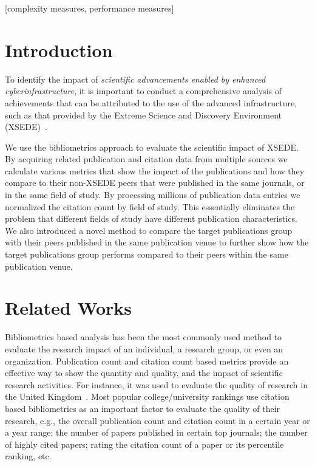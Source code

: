 \documentclass{sig-alternate}
\begin{document}
\vspace{-6pt}

[complexity measures,
performance measures]



\section{Introduction} 

To identify the impact of {\em scientific advancements enabled by
  enhanced cyberinfrastructure}, it is important to conduct a
comprehensive analysis of achievements that can be attributed to the
use of the advanced infrastructure, such as that provided by the
Extreme Science and Discovery Environment
(XSEDE)~\cite{www-xsede,xsede}.

We use the bibliometrics approach to evaluate the scientific impact of
XSEDE. By acquiring related publication and citation data from
multiple sources we calculate various metrics that show the impact of
the publications and how they compare to their non-XSEDE peers that
were published in the same journals, or in the same field of study. By
processing millions of publication data entries we normalized the
citation count by field of study. This essentially eliminates the
problem that different fields of study have different publication
characteristics. We also introduced a novel method to compare the
target publications group with their peers published in the same
publication venue to further show how the target publications group
performs compared to their peers within the same publication venue.


\section{Related Works} \label{S:related}

Bibliometrics based analysis has been the most commonly used method to
evaluate the research impact of an individual, a research group, or
even an organization. Publication count and citation count based
metrics provide an effective way to show the quantity and quality, and
the impact of scientific research activities. For instance, it was
used to evaluate the quality of research in the United
Kingdom~\cite{thomas1998institutional,penfield2014assessment}. Most
popular college/university rankings use citation based bibliometrics
as an important factor to evaluate the quality of their research,
e.g., the overall publication count and citation count in a certain
year or a year range; the number of papers published in certain top
journals; the number of highly cited papers; rating the citation count
of a paper or its percentile ranking, etc.
\end{document}
